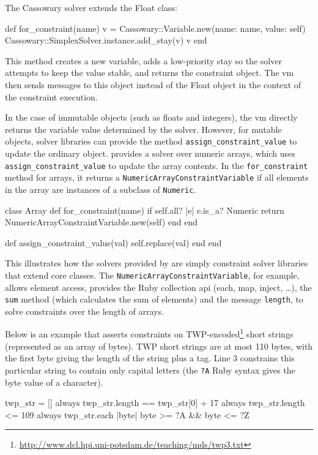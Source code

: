 The Cassowary solver extends the Float class:
\begin{code}
  def for_constraint(name)
    v = Cassowary::Variable.new(name: name, value: self)
    Cassowary::SimplexSolver.instance.add_stay(v)
    v
  end
\end{code}

This method creates a new variable, adds a low-priority stay so the
solver attempts to keep the value stable, and returns the constraint
object. The \ac{vm} then sends messages to this object instead of the
Float object in the context of the constraint execution.

In the case of immutable objects (such as floats and integers), the
\ac{vm} directly returns the variable value determined by the solver.
However, for mutable objects, solver libraries can provide
the method \lstinline{assign_constraint_value} to update the ordinary
object. \toolname provides a solver over numeric arrays, which uses
\lstinline{assign_constraint_value} to update the array contents. In
the \lstinline{for_constraint} method for arrays, it returns a
\lstinline{NumericArrayConstraintVariable} if all elements in the
array are instances of a subclass of \lstinline{Numeric}.
\begin{code}
class Array
  def for_constraint(name)
    if self.all? { |e| e.is_a? Numeric }
      return NumericArrayConstraintVariable.new(self)
    end
  end

  def assign_constraint_value(val)
    self.replace(val)
  end
end
\end{code}

This illustrates how the solvers provided by \toolname are simply
constraint solver libraries that extend core classes. The
\lstinline{NumericArrayConstraintVariable}, for example, allows
element access, provides the Ruby collection \ac{api} (each, map,
inject, \dots), the \lstinline{sum} method (which calculates the sum
of elements) and the message \lstinline{length}, to solve constraints
over the length of arrays.

Below is an example that asserts constraints on
\textsc{TWP}-encoded\footnote{\url{http://www.dcl.hpi.uni-potsdam.de/teaching/mds/twp3.txt}}
short strings (represented as an array of bytes). \textsc{TWP} short
strings are at most 110 bytes, with the first byte giving the length
of the string plus a tag. Line 3 constrains this particular string to
contain only capital letters (the \lstinline{?A} Ruby syntax gives the
byte value of a character).
\begin{code}
twp_str = []
always { twp_str.length == twp_str[0] + 17 }
always { twp_str.length <= 109 }
always { twp_str.each {|byte| byte >= ?A && byte <= ?Z} }
\end{code}

